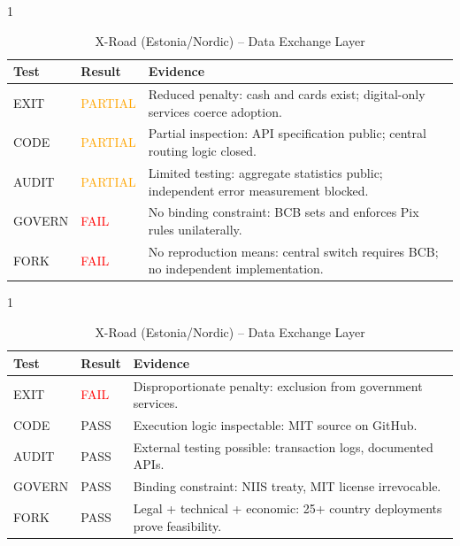 \documentclass{article}
\begin{document}
\begin{table}[htbp]
    \begin{subtable}{1\textwidth}
        \centering
        \caption{Pix (Brazil) -- Central Bank Payment}
        \small
        \begin{tabular}{@{}llp{8.5cm}@{}}
            \toprule
            \textbf{Test} & \textbf{Result} & \textbf{Evidence} \\
            \midrule
            EXIT & \textcolor{orange}{PARTIAL} & Reduced penalty: cash and cards exist; digital-only services coerce adoption. \\
            CODE & \textcolor{orange}{PARTIAL} & Partial inspection: API specification public; central routing logic closed. \\
            AUDIT & \textcolor{orange}{PARTIAL} & Limited testing: aggregate statistics public; independent error measurement blocked. \\
            GOVERN & \textcolor{red}{FAIL} & No binding constraint: BCB sets and enforces Pix rules unilaterally. \\
            FORK & \textcolor{red}{FAIL} & No reproduction means: central switch requires BCB; no independent implementation. \\
            \bottomrule
        \end{tabular}
        \vspace{0.3cm}
    \end{subtable}

    \begin{subtable}{1\textwidth}
        \centering
        \caption{X-Road (Estonia/Nordic) -- Data Exchange Layer}
        \small
        \begin{tabular}{@{}llp{8.5cm}@{}}
            \toprule
            \textbf{Test} & \textbf{Result} & \textbf{Evidence} \\
            \midrule
            EXIT & \textcolor{red}{FAIL} & Disproportionate penalty: exclusion from government services. \\
            CODE & \textcolor{green!50!black}{PASS} & Execution logic inspectable: MIT source on GitHub. \\
            AUDIT & \textcolor{green!50!black}{PASS} & External testing possible: transaction logs, documented APIs. \\
            GOVERN & \textcolor{green!50!black}{PASS} & Binding constraint: NIIS treaty, MIT license irrevocable. \\
            FORK & \textcolor{green!50!black}{PASS} & Legal + technical + economic: 25+ country deployments prove feasibility. \\
            \bottomrule
        \end{tabular}
        \vspace{0.3cm}
    \end{subtable}


\end{table}
\end{document}
